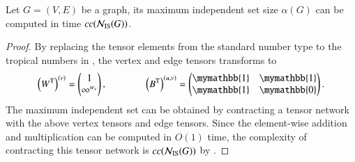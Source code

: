 \documentclass[review, onefignum, onetabnum]{siamart190516}
\begin{document}
\begin{theorem}\label{thm:complextropical}
    Let $G = (V, E)$ be a graph, its maximum independent set size $\alpha(G)$ can be computed in time $cc({\mathcal{N}_{\rm IS}(G)})$.
\end{theorem}
\begin{proof}
By replacing the tensor elements from the standard number type to the tropical numbers in , the vertex and edge tensors transforms to
\begin{equation}\label{eq:tensor-topical}
    \left(W^{\rm T}\right)^{(v)} = \left(\begin{matrix}
        1 \\
        \infty^{w_v}
    \end{matrix}\right),   
    \qquad \qquad
        \left(B^{\rm T}\right)^{(u, v)} = \left(\begin{matrix}
        \mymathbb{1}  & \mymathbb{1} \\
        \mymathbb{1} & \mymathbb{0}
    \end{matrix}\right).
\end{equation}
The maximum independent set can be obtained by contracting a tensor network with the above vertex tensors and edge tensors.
Since the element-wise addition and multiplication can be computed in $O(1)$ time, the complexity of contracting this tensor network is $cc({\mathcal{N}_{\rm IS}(G)})$ by .
\end{proof}
\end{document}
